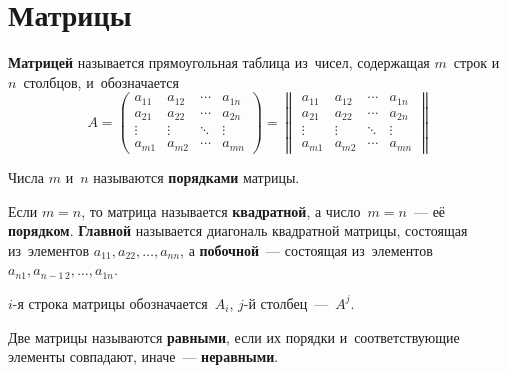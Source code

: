\section{Матрицы}
\textbf{Матрицей} называется прямоугольная таблица из~чисел, содержащая $m$~строк и~$n$~столбцов, и~обозначается
\begin{equation*}
A =
\begin{pmatrix}
a_{11} & a_{12} & \cdots & a_{1n} \\
a_{21} & a_{22} & \cdots & a_{2n} \\
\vdots & \vdots & \ddots & \vdots \\
a_{m1} & a_{m2} & \cdots & a_{mn}
\end{pmatrix} =
\begin{Vmatrix}
a_{11} & a_{12} & \cdots & a_{1n} \\
a_{21} & a_{22} & \cdots & a_{2n} \\
\vdots & \vdots & \ddots & \vdots \\
a_{m1} & a_{m2} & \cdots & a_{mn}
\end{Vmatrix}
\end{equation*}

Числа $m$ и~$n$ называются \textbf{порядками} матрицы.

Если $m = n$, то матрица называется \textbf{квадратной}, а число~$m = n$~--- её \textbf{порядком}.
\textbf{Главной} называется диагональ квадратной матрицы, состоящая из~элементов $a_{11}, a_{22}, \ldots, a_{nn}$, а \textbf{побочной}~--- состоящая из~элементов $a_{n1}, a_{n-1\, 2}, \ldots, a_{1n}$.

$i$\nobreakdash-я строка матрицы обозначается~$A_i$, $j$\nobreakdash-й столбец~---~$A^j$.

Две матрицы называются \textbf{равными}, если их порядки и~соответствующие элементы совпадают, иначе~--- \textbf{неравными}.